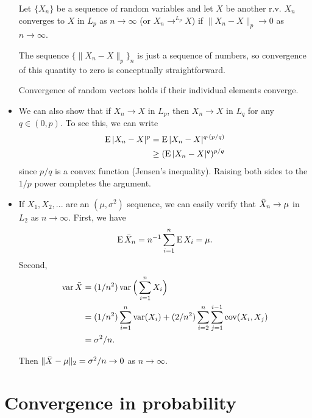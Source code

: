 \begin{itemize}[leftmargin=0pt]
  \begin{defn}
    Let $\{X_n\}$ be a sequence of random variables and let $X$ be
    another r.v.  $X_n$ converges to $X$ in $L_p$ as $n \to \infty$ (or $X_n
    \to^{L_p} X$) if $\lVert X_n - X \rVert_p \to 0$ as $n \to \infty$.
  \end{defn}
  The sequence $\{\lVert X_n - X \rVert_p\}_n$ is just a sequence of
  numbers, so convergence of this quantity to zero is conceptually
  straightforward.

  Convergence of random vectors holds if their individual elements
  converge.

\item We can also show that if $X_n \to X$ in $L_p$, then $X_n \to X$ in
  $L_q$ for any $q \in (0, p)$.  To see this, we can write
  \begin{align*}
    \operatorname{E} | X_n - X |^p
    &= \operatorname{E} | X_n - X |^{q \cdot (p/q)} \\
    &\geq (\operatorname{E} | X_n - X |^{q})^{p/q}
  \end{align*}
  since $p/q$ is a convex function (Jensen's inequality).  Raising
  both sides to the $1/p$ power completes the argument.

\item If $X_1, X_2,...$ are an \iid$(\mu, \sigma^2)$ sequence, we can easily
  verify that $\bar{X}_n \to \mu$ in $L_2$ as $n \to \infty$.  First, we have
  \begin{equation*}
    \operatorname{E} \bar{X}_n = n^{-1} \sum_{i=1}^n \operatorname{E} X_i = \mu.
  \end{equation*}
  Second,
  \begin{align*}
    \operatorname{var} \bar{X} &= (1/n^2) \operatorname{var}\Big( \sum_{i=1}^n X_i \Big)\\
    &= (1/n^2) \sum_{i=1}^n \operatorname{var}(X_i) + (2/n^2) \sum_{i=2}^n \sum_{j=1}^{i-1} \operatorname{cov}(X_i, X_j) \\
    &= \sigma^2 / n.
  \end{align*}
  
  Then $\lVert \bar{X} - \mu \rVert_2 = \sigma^2/n \to 0$ as $n \to \infty$.
  
\end{itemize}

\section{Convergence in probability}

